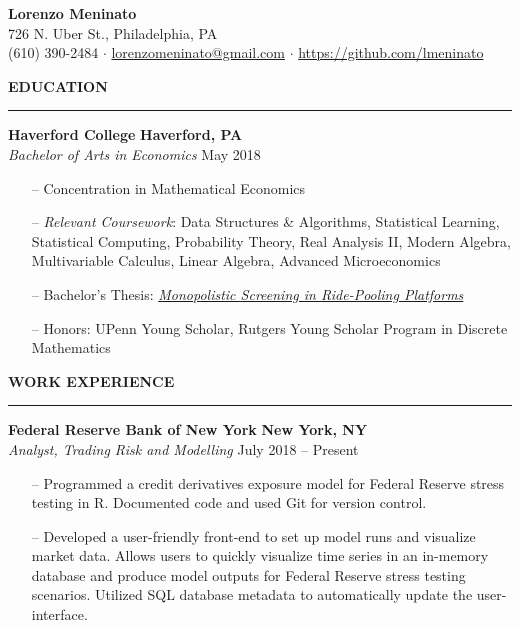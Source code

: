 \documentclass[paper=a4, fontsize=11pt]{scrartcl} %
\newcommand{\I}{--}
\newenvironment{mycenter}[1][\topsep]
  {\setlength{\topsep}{#1}\par\kern\topsep\centering}%
  {\par\kern\topsep}%
\newcommand*{\email}[1]{%
  \normalsize\href{mailto:#1}{#1}
  }
\begin{document}
\begin{mycenter}
\textbf{\LARGE Lorenzo Meninato} \\
726 N. Uber St., Philadelphia, PA \\
(610) 390-2484 $\cdot$ \email{lorenzomeninato@gmail.com} $\cdot$ \href{https://github.com/lmeninato}{https://github.com/lmeninato}

\end{mycenter}

\begin{mycenter}[0pt]
\textsc{\textbf{EDUCATION}}
\end{mycenter}

\vspace{-3mm}
\rule{\textwidth}{0.4pt}

\textbf{Haverford College} \hfill  \textbf{Haverford, PA} \\
\textit{Bachelor of Arts in Economics} \hfill May 2018

\begin{itemize}[topsep=0pt,noitemsep]
    \item[\I] Concentration in Mathematical Economics
	\item[\I] \textit{Relevant Coursework}: Data Structures \& Algorithms, Statistical Learning, Statistical Computing, Probability Theory, Real Analysis II, Modern Algebra, Multivariable Calculus, Linear Algebra, Advanced Microeconomics
	\item[\I] Bachelor's Thesis: \textit{\href{https://github.com/lmeninato/ECON396/blob/master/Lorenzo\%20Meninato\%20Thesis.pdf}{Monopolistic Screening in Ride-Pooling Platforms}}
	\item[\I] Honors: UPenn Young Scholar, Rutgers Young Scholar Program in Discrete Mathematics
\end{itemize}

\vspace{2mm}

\begin{mycenter}[0pt]
\textsc{\textbf{WORK EXPERIENCE}}
\end{mycenter}

\vspace{-3mm}
\rule{\textwidth}{0.4pt}

\textbf{Federal Reserve Bank of New York} \hfill \textbf{New York, NY} \\
\textit{Analyst, Trading Risk and Modelling} \hfill July 2018 -- Present
\begin{itemize}[topsep=0pt,noitemsep]
	\item[\I] Programmed a credit derivatives exposure model for Federal Reserve stress testing in R. Documented code and used Git for version control.
	\item[\I] Developed a user-friendly front-end to set up model runs and visualize market data. Allows users to quickly visualize time series in an in-memory database and produce model outputs for Federal Reserve stress testing scenarios. Utilized SQL database metadata to automatically update the user-interface. 
\end{itemize}
\end{document}
